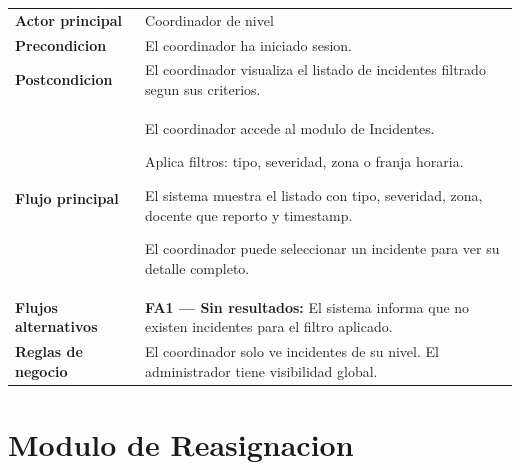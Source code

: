 \documentclass[12pt, a4paper]{article}
\newcommand{\cu}[3]{%
  \begin{tcolorbox}[casousostyle, title={#1},
    after title={\hfill\small\normalfont\color{white!80!azulOscuro}#2}]
  \renewcommand{\arraystretch}{1.35}
  \begin{tabularx}{\linewidth}{>{\bfseries\color{azulOscuro}\small}p{3.6cm} X}
  #3
  \end{tabularx}
  \end{tcolorbox}
  \vspace{6pt}
}
\newcommand{\fcu}[2]{\small\textbf{\color{azulOscuro}#1} & \small #2 \\}
\begin{document}
\cu{CU-08 --- Consultar historial de incidentes}{Coordinador / Admin}{
  \fcu{Actor principal}{Coordinador de nivel}
  \fcu{Precondicion}{El coordinador ha iniciado sesion.}
  \fcu{Postcondicion}{El coordinador visualiza el listado de incidentes filtrado segun sus criterios.}
  \fcu{Flujo principal}{
    \begin{pasos}
      \item El coordinador accede al modulo de Incidentes.
      \item Aplica filtros: tipo, severidad, zona o franja horaria.
      \item El sistema muestra el listado con tipo, severidad, zona, docente que reporto y timestamp.
      \item El coordinador puede seleccionar un incidente para ver su detalle completo.
    \end{pasos}
  }
  \fcu{Flujos alternativos}{
    \textbf{FA1 --- Sin resultados:} El sistema informa que no existen incidentes para el filtro aplicado.
  }
  \fcu{Reglas de negocio}{El coordinador solo ve incidentes de su nivel. El administrador tiene visibilidad global.}
}

\newpage

\section{Modulo de Reasignacion}
\end{document}
